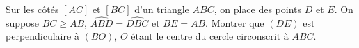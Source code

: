 Sur les côtés $[AC]$ et $[BC]$ d'un triangle $ABC$, on place des points $D$ et $E$. On suppose $BC \geq AB$, $\widehat{ABD} = \widehat{DBC}$ et $BE = AB$. Montrer que $(DE)$ est perpendiculaire à $(BO)$, $O$ étant le centre du cercle circonscrit à $ABC$.
